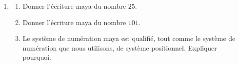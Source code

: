 \begin{enumerate}
\begin{minipage}{3cm}
\begin{enumerate}
\end{enumerate}
\end{minipage}
\item 
\begin{enumerate}
	\item Donner l'écriture maya du nombre $25$.
	\item Donner l'écriture maya du nombre $101$.
	\item Le système de numération maya est qualifié, tout comme le système de numération
que nous utilisons, de système positionnel. Expliquer pourquoi.
\end{enumerate}
\end{enumerate}